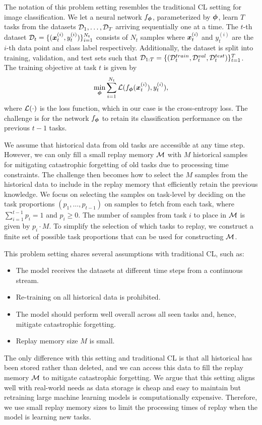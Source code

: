 The notation of this problem setting resembles the traditional CL setting for image classification. We let a neural network $f_{{\bm{\phi}}}$, parameterized by ${\bm{\phi}}$, learn $T$ tasks from the datasets ${\mathcal{D}}_1, \dots, {\mathcal{D}}_T$ arriving sequentially one at a time. The $t$-th dataset ${\mathcal{D}}_t = \{({\bm{x}}_{t}^{(i)}, y_{t}^{(i)})\}_{i=1}^{N_{t}}$ consists of $N_t$ samples where ${\bm{x}}_{t}^{(i)}$ and $y_{t}^{(i)}$ are the $i$-th data point and class label respectively. Additionally, the dataset is split into training, validation, and test sets such that ${\mathcal{D}}_{1:T} = \{({\mathcal{D}}_{t}^{train}, {\mathcal{D}}_{t}^{val}, {\mathcal{D}}_{t}^{test})\}_{t=1}^{T}$. The training objective at task $t$ is given by 
\begin{align}
	\underset{{\bm{\phi}}}{\text{min}} \sum_{i=1}^{N_t} {\mathcal{L}}(f_{{\bm{\phi}}}({\bm{x}}_t^{(i)}), y_{t}^{(i)}),
\end{align}
where ${\mathcal{L}}(\cdot)$ is the loss function, which in our case is the cross-entropy loss. The challenge is for the network $f_{{\bm{\phi}}}$ to retain its classification performance on the previous $t-1$ tasks. 

We assume that historical data from old tasks are accessible at any time step. However, we can only fill a small replay memory ${\mathcal{M}}$ with $M$ historical samples for mitigating catastrophic forgetting of old tasks due to processing time constraints. The challenge then becomes how to select the $M$ samples from the historical data to include in the replay memory that efficiently retain the previous knowledge. 
We focus on selecting the samples on task-level by deciding on the task proportions $(p_1, \dots, p_{t-1})$ on samples to fetch from each task, where $\sum_{i=1}^{t-1} p_i = 1$ and $p_{i} \geq 0$. The number of samples from task $i$ to place in ${\mathcal{M}}$ is given by $p_i \cdot M$. To simplify the selection of which tasks to replay, we construct a finite set of possible task proportions that can be used for constructing ${\mathcal{M}}$. 

This problem setting shares several assumptions with traditional CL, such as:
\begin{itemize}[noitemsep,topsep=1pt]
	\item The model receives the datasets at different time steps from a continuous stream.
	\item Re-training on all historical data is prohibited.
	\item The model should perform well overall across all seen tasks and, hence, mitigate catastrophic forgetting.
	\item Replay memory size $M$ is small.
\end{itemize}
The only difference with this setting and traditional CL is that all historical has been stored rather than deleted, and we can access this data to fill the replay memory ${\mathcal{M}}$ to mitigate catastrophic forgetting. We argue that this setting aligns well with real-world needs as data storage is cheap and easy to maintain but retraining large machine learning models is computationally expensive. Therefore, we use small replay memory sizes to limit the processing times of replay when the model is learning new tasks. 


